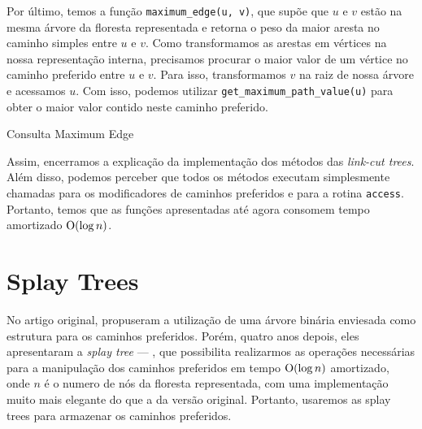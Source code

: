 Por último, temos a função \texttt{maximum\_edge(u, v)}, que supõe que $u$ e $v$ estão na mesma árvore da floresta representada e retorna o peso da maior aresta no caminho simples entre $u$ e $v$. Como transformamos as arestas em vértices na nossa representação interna, precisamos procurar o maior valor de um vértice no caminho preferido entre $u$ e $v$. Para isso, transformamos $v$ na raiz de nossa árvore e acessamos $u$. Com isso, podemos utilizar \texttt{get\_maximum\_path\_value(u)} para obter o maior valor contido neste caminho preferido.

\begin{algorithm}[h!]
    \caption{Consulta Maximum Edge}\label{lct:max-edge}
    \begin{algorithmic}[1]
        \State {}
        \EndFunction
    \end{algorithmic}
\end{algorithm}

Assim, encerramos a explicação da implementação dos métodos das \emph{link-cut trees}. Além disso, podemos perceber que todos os métodos executam simplesmente chamadas para os modificadores de caminhos preferidos e para a rotina \texttt{access}. Portanto, temos que as funções apresentadas até agora consomem tempo amortizado $\mathrm{O}(\log n)$.

\section{Splay Trees}
\label{sec:lct-splay-trees}

No artigo original, \citet{10.1145/800076.802464} propuseram a utilização de uma árvore binária enviesada como estrutura para os caminhos preferidos. Porém, quatro anos depois, eles apresentaram a \emph{splay tree} --- \citet{10.1145/3828.3835}, que possibilita realizarmos as operações necessárias para a manipulação dos caminhos preferidos em tempo $\mathrm{O}(\log n)$ amortizado, onde $n$ é o numero de nós da floresta representada, com uma implementação muito mais elegante do que a da versão original. Portanto, usaremos as splay trees para armazenar os caminhos preferidos.


